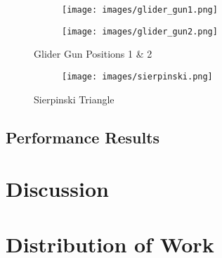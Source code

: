 \documentclass[11pt]{article}
\begin{document}
\begin{figure}[!ht]
	\centering
	\begin{subfigure}{.45\textwidth}
		\centering
  	  	\texttt{[image: images/glider\_gun1.png]}
  	  	\label{fig:glider_gun1}
	\end{subfigure}
	\begin{subfigure}{.45\textwidth}
  	  	\centering
  	  	\texttt{[image: images/glider\_gun2.png]}
  	  	\label{fig:glider_gun2}
	\end{subfigure}
	\caption{Glider Gun Positions 1 \& 2}
	\label{fig:glider_gun}
\end{figure}

\begin{figure}[!ht]
	\centering
	\begin{subfigure}{\textwidth}
		\centering
  	  	\texttt{[image: images/sierpinski.png]}
  	  	\label{fig:sierpinski1}
	\end{subfigure}
	\caption{Sierpinski Triangle}
	\label{fig:sierpinski_triangle}
\end{figure}

\subsection{Performance Results}

\section{Discussion}

\section{Distribution of Work}
\end{document}
